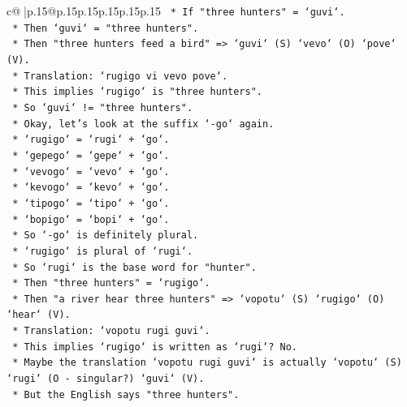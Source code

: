 \documentclass{article}
\begin{document}
{\begin{supertabular}{c@{$\;$}|p{.15\linewidth}@{}p{.15\linewidth}p{.15\linewidth}p{.15\linewidth}p{.15\linewidth}p{.15\linewidth}}
{{{\texttt{                        *   If "three hunters" = `guvi`.} \\
\texttt{                        *   Then `guvi` = "three hunters".} \\
\texttt{                        *   Then "three hunters feed a bird" => `guvi` (S) `vevo` (O) `pove` (V).} \\
\texttt{                        *   Translation: `rugigo vi vevo pove`.} \\
\texttt{                        *   This implies `rugigo` is "three hunters".} \\
\texttt{                        *   So `guvi` != "three hunters".} \\
\texttt{                        *   Okay, let's look at the suffix `{-}go` again.} \\
\texttt{                        *   `rugigo` = `rugi` + `go`.} \\
\texttt{                        *   `gepego` = `gepe` + `go`.} \\
\texttt{                        *   `vevogo` = `vevo` + `go`.} \\
\texttt{                        *   `kevogo` = `kevo` + `go`.} \\
\texttt{                        *   `tipogo` = `tipo` + `go`.} \\
\texttt{                        *   `bopigo` = `bopi` + `go`.} \\
\texttt{                        *   So `{-}go` is definitely plural.} \\
\texttt{                        *   `rugigo` is plural of `rugi`.} \\
\texttt{                        *   So `rugi` is the base word for "hunter".} \\
\texttt{                        *   Then "three hunters" = `rugigo`.} \\
\texttt{                        *   Then "a river hear three hunters" => `vopotu` (S) `rugigo` (O) `hear` (V).} \\
\texttt{                        *   Translation: `vopotu rugi guvi`.} \\
\texttt{                        *   This implies `rugigo` is written as `rugi`? No.} \\
\texttt{                        *   Maybe the translation `vopotu rugi guvi` is actually `vopotu` (S) `rugi` (O {-} singular?) `guvi` (V).} \\
\texttt{                        *   But the English says "three hunters".} \\
}}}
\end{supertabular}}
\end{document}

